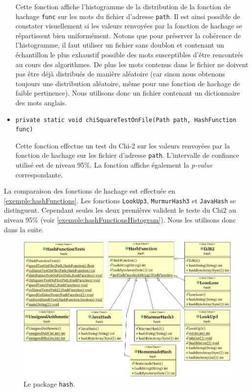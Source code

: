 \documentclass[12pt,a4paper,titlepage]{article}
\newcommand{\class}[1]{\texttt{#1}}
\begin{document}
\begin{itemize}
Cette fonction affiche l'histogramme de la distribution de la fonction de hachage \class{func} sur les mots du fichier d'adresse \class{path}. Il est ainsi possible de constater visuellement si les valeurs renvoyées par la fonction de hachage se répartissent bien uniformément. Notons que pour préserver la cohérence de l'histogramme, il faut utiliser un fichier sans doublon et contenant un échantillon le plus exhaustif possible des mots susceptibles d'être rencontrés au cours des algorithmes. De plus les mots contenus dans le fichier ne doivent pas être déjà distribués de manière aléatoire (car sinon nous obtenons toujours une distribution aléatoire, même pour une fonction de hachage de faible pertinence). Nous utilisons donc un fichier contenant un dictionnaire des mots anglais.

\item \begin{lstlisting}
private static void chiSquareTestOnFile(Path path, HashFunction func)
\end{lstlisting}
Cette fonction effectue un test du Chi-2 sur les valeurs renvoyées par la fonction de hachage sur les fichier d'adresse \class{path}. L'intervalle de confiance utilisé est de niveau 95\%. La fonction  affiche également la \textit{p-value} correspondante.

\end{itemize}

La comparaison des fonctions de hachage est effectuée en \ref{exemple:hashFunctions}. Les fonctions \class{LookUp3}, \class{MurmurHash3} et \class{JavaHash} se distinguent. Cependant seules les deux premières valident le teste du Chi2 au niveau 95\% (voir \ref{exemple:hashFunctionsHistogram}). Nous les utilisons donc dans la suite.

\begin{figure}
	\label{fig:hashPackage}
	\centering
	\includegraphics[scale=0.75, angle=90]{../Java Workspace/Test Hash/hashPackage.png}
	\caption{Le package \class{hash}.}
\end{figure}
\end{document}
